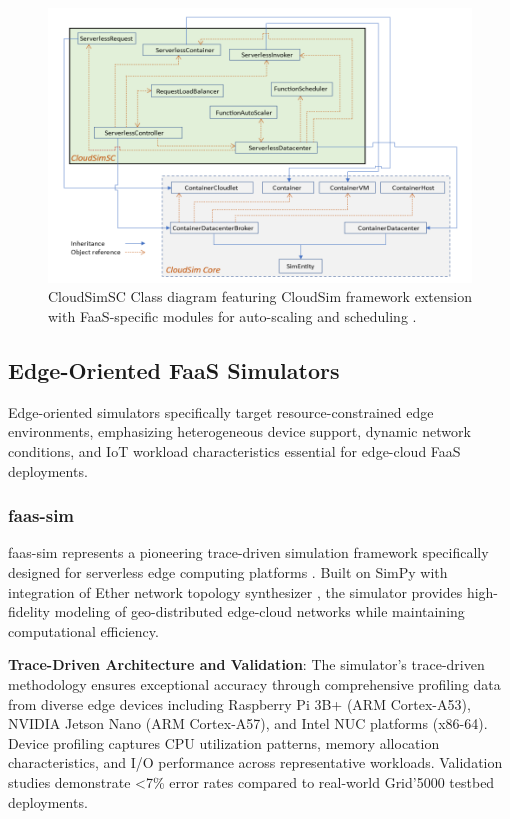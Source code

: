 \begin{figure}[htbp]
\centering
\includegraphics[width=1\textwidth]{Assets/cloudsimcs.png}
\caption{CloudSimSC Class diagram featuring CloudSim framework extension with FaaS-specific modules for auto-scaling and scheduling \cite{mampage2021cloudsimsc}.}
\label{fig:cloudsimsc-architecture}
\end{figure}

\subsection{Edge-Oriented FaaS Simulators}

Edge-oriented simulators specifically target resource-constrained edge environments, emphasizing heterogeneous device support, dynamic network conditions, and IoT workload characteristics essential for edge-cloud FaaS deployments.

\subsubsection{faas-sim}

faas-sim represents a pioneering trace-driven simulation framework specifically designed for serverless edge computing platforms \cite{boughzala2022faassim}. Built on SimPy with integration of Ether network topology synthesizer \cite{rausch2020ether}, the simulator provides high-fidelity modeling of geo-distributed edge-cloud networks while maintaining computational efficiency.

\textbf{Trace-Driven Architecture and Validation}: The simulator's trace-driven methodology ensures exceptional accuracy through comprehensive profiling data from diverse edge devices including Raspberry Pi 3B+ (ARM Cortex-A53), NVIDIA Jetson Nano (ARM Cortex-A57), and Intel NUC platforms (x86-64). Device profiling captures CPU utilization patterns, memory allocation characteristics, and I/O performance across representative workloads. Validation studies demonstrate <7\% error rates compared to real-world Grid'5000 testbed deployments.

